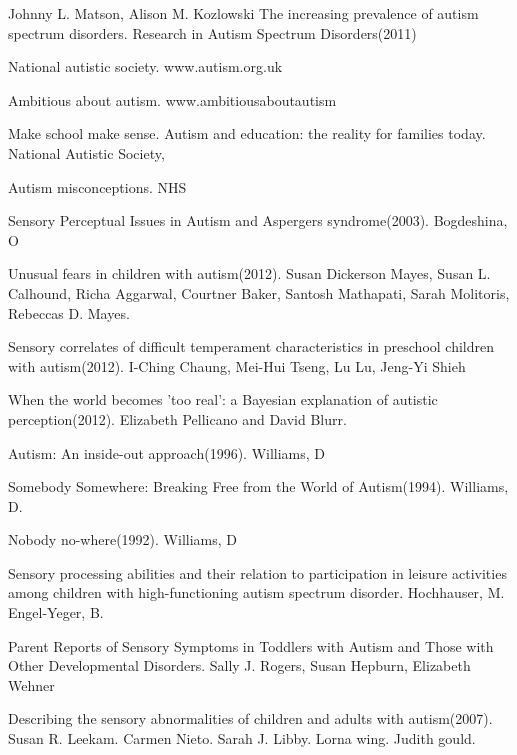 \documentclass[11pt]{report}
\begin{document}
\begin{thebibliography}{9}

Johnny L. Matson, Alison M. Kozlowski
The increasing prevalence of autism spectrum disorders. Research in Autism Spectrum Disorders(2011)

National autistic society. www.autism.org.uk

Ambitious about autism. www.ambitiousaboutautism

Make school make sense. Autism and education: the reality for families today. National Autistic Society, 

Autism misconceptions. NHS

Sensory Perceptual Issues in Autism and Aspergers syndrome(2003). Bogdeshina, O

Unusual fears in children with autism(2012). Susan Dickerson Mayes, Susan L. Calhound, Richa Aggarwal, Courtner Baker, Santosh Mathapati, Sarah Molitoris, Rebeccas D. Mayes.

Sensory correlates of difficult temperament characteristics in preschool children with autism(2012). I-Ching Chaung, Mei-Hui Tseng, Lu Lu, Jeng-Yi Shieh

When the world becomes 'too real': a Bayesian explanation of autistic perception(2012). Elizabeth Pellicano and David Blurr.

Autism: An inside-out approach(1996). Williams, D

Somebody Somewhere: Breaking Free from the World of Autism(1994). Williams, D.

Nobody no-where(1992). Williams, D

Sensory processing abilities and their relation to participation in leisure activities among children with high-functioning autism spectrum disorder. Hochhauser, M. Engel-Yeger, B.

Parent Reports of Sensory Symptoms in Toddlers with Autism and Those with Other Developmental Disorders. Sally J. Rogers, Susan Hepburn, Elizabeth Wehner

Describing the sensory abnormalities of children and adults with autism(2007). Susan R. Leekam. Carmen Nieto. Sarah J. Libby. Lorna wing. Judith gould. 


\end{thebibliography}
\end{document}
